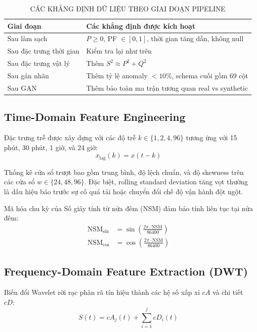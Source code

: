 \begin{table}[htbp]
\caption{CÁC KHẲNG ĐỊNH DỮ LIỆU THEO GIAI ĐOẠN PIPELINE}
\label{tab:assertions}
\centering
\small
\begin{tabular}{@{}p{2.0cm}p{5.0cm}@{}}
\toprule
Giai đoạn & Các khẳng định được kích hoạt \\
\midrule
Sau làm sạch & $P \ge 0$, PF $\in [0,1]$, thời gian tăng dần, không null \\
Sau đặc trưng thời gian & Kiểm tra lại như trên \\
Sau đặc trưng vật lý & Thêm $S^2 \approx P^2 + Q^2$ \\
Sau gán nhãn & Thêm tỷ lệ anomaly $< 10\%$, schema cuối gồm 69 cột \\
Sau GAN & Thêm bảo toàn ma trận tương quan real vs synthetic \\
\bottomrule
\end{tabular}
\end{table}

\subsection{Time-Domain Feature Engineering}

Đặc trưng trễ được xây dựng với các độ trễ $k \in \{1, 2, 4, 96\}$
tương ứng với 15 phút, 30 phút, 1 giờ, và 24 giờ:
\begin{equation}
x_{\text{lag}}(k) = x(t - k)
\label{eq:lag}
\end{equation}

Thống kê cửa sổ trượt bao gồm trung bình, độ lệch chuẩn,
và độ skewness trên các cửa sổ $w \in \{24, 48, 96\}$.
Đặc biệt, rolling standard deviation tăng vọt thường là dấu hiệu báo trước sự cố quá tải hoặc chuyển đổi chế độ vận hành đột ngột.

Mã hóa chu kỳ của Số giây tính từ nửa đêm (NSM)
đảm bảo tính liên tục tại nửa đêm:
\begin{align}
\text{NSM}_{\sin} &= \sin\left(\frac{2\pi \cdot \text{NSM}}{86400}\right) \\
\text{NSM}_{\cos} &= \cos\left(\frac{2\pi \cdot \text{NSM}}{86400}\right)
\end{align}

\subsection{Frequency-Domain Feature Extraction (DWT)}

Biến đổi Wavelet rời rạc phân rã tín hiệu thành
các hệ số xấp xỉ $cA$ và chi tiết $cD$:
\begin{equation}
S(t) = cA_j(t) + \sum_{i=1}^{j} cD_i(t)
\label{eq:dwt}
\end{equation}

